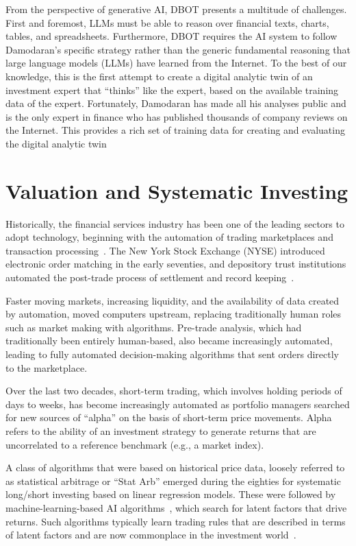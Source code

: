 \documentclass[]{interact}
\theoremstyle{plain}%
\theoremstyle{definition}
\theoremstyle{remark}
\begin{document}
From the perspective of generative AI, DBOT presents a multitude of challenges. First and foremost, LLMs must be able to reason over financial texts, charts, tables, and spreadsheets. Furthermore, DBOT requires the AI system to follow Damodaran's specific strategy rather than the generic fundamental reasoning that large language models (LLMs) have learned from the Internet. To the best of our knowledge, this is the first attempt to create a digital analytic twin of an investment expert that ``thinks'' like the expert, based on the available training data of the expert. Fortunately, Damodaran has made all his analyses public and is the only expert in finance who has published thousands of company reviews on the Internet. This provides a rich set of training data for creating and evaluating the digital analytic twin



\section{Valuation and Systematic Investing}
\label{sec:valuation}
Historically, the financial services industry has been one of the leading sectors to adopt technology, beginning with the automation of trading marketplaces and transaction processing~\citep{steiner2012automate}. The New York Stock Exchange (NYSE) introduced electronic order matching in the early seventies, and depository trust institutions automated the post-trade process of settlement and record keeping~\citep{weiss2006after}.

Faster moving markets, increasing liquidity, and the availability of data created by automation, moved computers upstream, replacing traditionally human roles such as market making with algorithms. Pre-trade analysis, which had traditionally been entirely human-based, also became increasingly automated, leading to fully automated decision-making algorithms that sent orders directly to the marketplace. 

Over the last two decades, short-term trading, which involves holding periods of days to weeks, has become increasingly automated as portfolio managers searched for new sources of ``alpha'' on the basis of short-term price movements. Alpha refers to the ability of an investment strategy to generate returns that are uncorrelated to a reference benchmark (e.g., a market index). 

A class of algorithms that were based on historical price data, loosely referred to as statistical arbitrage or ``Stat Arb'' \citep{grinold2000active} emerged during the eighties for systematic long/short investing based on linear regression models. These were followed by machine-learning-based AI algorithms~\citep{dhar2000discovering}, which search for latent factors that drive returns. Such algorithms typically learn trading rules that are described in terms of latent factors and are now commonplace in the investment world~\citep{de2018advances}.
\end{document}
